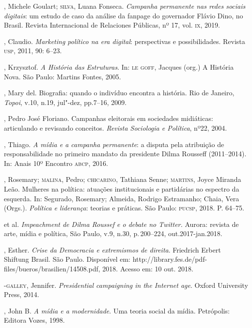 \begin{bibliohedra}
, Michele Goulart; \textsc{silva}, Luana Fonseca. \emph{Campanha
permanente nas redes sociais digitais}: um estudo de caso da análise da
fanpage do governador Flávio Dino, no Brasil. Revista Internacional de
Relaciones Públicas, nº 17, vol. \textsc{ix}, 2019.

, Claudio. \emph{Marketing político na era digital}:
perspectivas e possibilidades. Revista \textsc{usp}, 2011, 90: 6--23.

, Krzysztof. \emph{A História das Estruturas}. In: \textsc{le} \textsc{goff},
Jacques (org.) A História Nova. São Paulo: Martins Fontes, 2005.

, Mary del. Biografia: quando o indivíduo encontra a história. Rio
de Janeiro, \emph{Topoi}, v.10, n.19, jul"-dez, pp.7--16, 2009.

, Pedro José Floriano. Campanhas eleitorais em sociedades
midiáticas: articulando e revisando conceitos. \emph{Revista
Sociologia e Política}, nº22, 2004.

, Thiago. \emph{A mídia e a campanha permanente}: a disputa
pela atribuição de responsabilidade no primeiro mandato da presidente
Dilma Rousseff (2011--2014). In: Anais 10º Encontro \textsc{abcp}, 2016.

, Rosemary; \textsc{malina}, Pedro; \textsc{chicarino}, Tathiana Senne; \textsc{martins},
Joyce Miranda Leão. Mulheres na política: atuações institucionais e
partidárias no espectro da esquerda. In: Segurado, Rosemary; Almeida,
Rodrigo Estramanho; Chaia, Vera (Orgs.). \emph{Política e liderança}:
teorias e práticas. São Paulo: \textsc{pucsp}, 2018. P. 64--75.

\titidem\mbox{} et al. \emph{Impeachment de Dilma Roussef e o
debate no Twitter.} Aurora: revista de arte, mídia e política, São
Paulo, v.9, n.30, p.\,200--224, out.2017-jan.2018.

, Esther. \emph{Crise da Democracia e extremismos de direita}.
Friedrich Erbert Shiftung Brasil. São Paulo. Disponível em:
http://library.fes.de/pdf-files/bueros/brasilien/14508.pdf, 2018. Acesso
em: 10 out. 2018.

-\textsc{galley}, Jennifer. \emph{Presidential campaigning in the
Internet age}. Oxford University Press, 2014.

, John B. \emph{A mídia e a modernidade}. Uma teoria social da
mídia. Petrópolis: Editora Vozes, 1998.
\end{bibliohedra}

